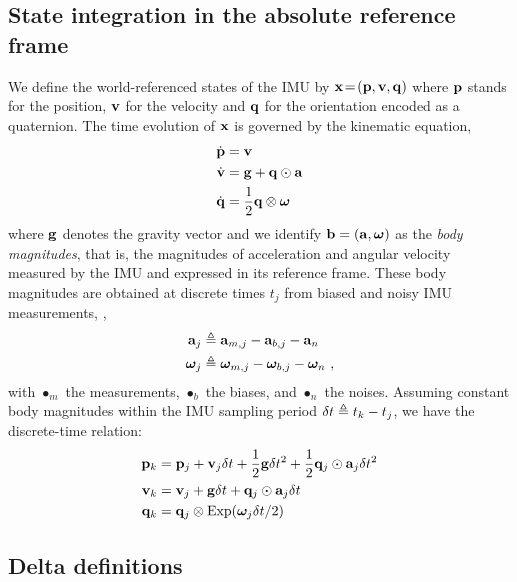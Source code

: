 \subsection{State integration in the absolute reference frame}

We define the world-referenced states of the IMU by \mbox{${\bf x}\!=\!({\bf p},{\bf v},{\bf q})$} where ${\bf p}$ stands for the position, ${\bf v}$ for the velocity and ${\bf q}$ for the orientation encoded as a quaternion.
The time evolution of ${\bf x}$ is governed by the kinematic equation,
%
\begin{align}\label{equ:cont_basic}
\begin{split}
\dot{{\bf p}} &= {\bf v} \\
\dot{{\bf v}} &= {\bf g} + {\bf q}\odot{\bf a} \\
\dot{{\bf q}} &= \frac12{\bf q}\otimes{{\bm \omega}} 
\end{split}
\end{align}
%
where ${\bf g}$ denotes the gravity vector and we identify ${\bf b}=({\bf a},{{\bm \omega}})$ as the \emph{body magnitudes}, that is, the magnitudes of acceleration and angular velocity measured by the IMU and expressed in its reference frame. These body magnitudes are obtained at discrete times $t_j$ from biased and noisy IMU measurements, \ie,
%
\begin{align}\label{equ:body}
\begin{split}
{\bf a}_j &\triangleq {\bf a}_{m,j} - {\bf a}_{b,j} - {\bf a}_n \\
{{\bm \omega}}_j  &\triangleq {{\bm \omega}}_{m,j}  - {{\bm \omega}}_{b,j}  - {{\bm \omega}}_n 
~,
\end{split}
\end{align}
%
with $\bullet_m$ the measurements, $\bullet_b$ the biases, and $\bullet_n$ the noises.
Assuming constant body magnitudes within the IMU sampling period $\delta t\triangleq t_k-t_j$, we have the discrete-time relation:
%
\begin{align}\label{equ:integration_state}
\begin{split}
{\bf p}_{k} &= {\bf p}_j + {\bf v}_j\delta t  + \frac12{\bf g}\delta t^2 + \frac12{\bf q}_j\odot{\bf a}_j\delta t^2 \\
{\bf v}_{k} &= {\bf v}_j + {\bf g}\delta t + {\bf q}_j\odot{\bf a}_j\delta t \\
{\bf q}_{k} &= {\bf q}_j\otimes\operatorname*{Exp}({{\bm \omega}}_j\delta t/2) 
\end{split}
\end{align}


\subsection{Delta definitions}

